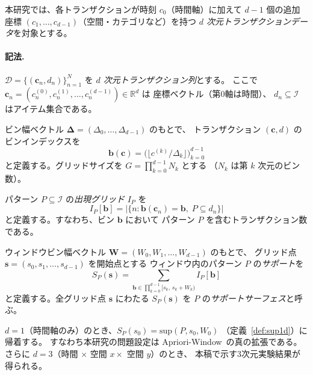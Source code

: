 本研究では、各トランザクションが時刻 $c_0$（時間軸）に加えて
$d-1$ 個の追加座標 $(c_1, \ldots, c_{d-1})$（空間・カテゴリなど）を持つ
\emph{$d$ 次元トランザクションデータ}を対象とする。

\paragraph{記法.}
$\mathcal{D} = \{(\bm{c}_n, d_n)\}_{n=1}^N$ を
\emph{$d$ 次元トランザクション列}とする。
ここで $\bm{c}_n = (c_n^{(0)}, c_n^{(1)}, \ldots, c_n^{(d-1)}) \in \mathbb{R}^d$ は
座標ベクトル（第0軸は時間）、
$d_n \subseteq \mathcal{I}$ はアイテム集合である。

\begin{definition}[$d$ 次元ビンインデックス]\label{def:bin_nd}
ビン幅ベクトル $\bm{\Delta} = (\Delta_0, \ldots, \Delta_{d-1})$ のもとで、
トランザクション $(\bm{c}, d)$ のビンインデックスを
\[
  \bm{b}(\bm{c}) = \bigl(\lfloor c^{(k)} / \Delta_k \rfloor\bigr)_{k=0}^{d-1}
\]
と定義する。グリッドサイズを $G = \prod_{k=0}^{d-1} N_k$ とする
（$N_k$ は第 $k$ 次元のビン数）。
\end{definition}

\begin{definition}[$d$ 次元アイテム出現グリッド]\label{def:item_grid_nd}
パターン $P \subseteq \mathcal{I}$ の\emph{出現グリッド} $I_P$ を
\[
  I_P[\bm{b}]
  = \bigl|\{n : \bm{b}(\bm{c}_n) = \bm{b},\; P \subseteq d_n\}\bigr|
\]
と定義する。すなわち、ビン $\bm{b}$ において
パターン $P$ を含むトランザクション数である。
\end{definition}

\begin{definition}[$d$ 次元スライディングウィンドウサポート]\label{def:support_nd}
ウィンドウビン幅ベクトル $\bm{W} = (W_0, W_1, \ldots, W_{d-1})$ のもとで、
グリッド点 $\bm{s} = (s_0, s_1, \ldots, s_{d-1})$ を開始点とする
ウィンドウ内のパターン $P$ の\emph{サポート}を
\begin{equation}\label{eq:support_nd}
  S_P(\bm{s})
  = \sum_{\bm{b} \in \prod_{k=0}^{d-1} [s_k,\, s_k + W_k)}
    I_P[\bm{b}]
\end{equation}
と定義する。全グリッド点 $\bm{s}$ にわたる $S_P(\bm{s})$ を
$P$ の\emph{サポートサーフェス}と呼ぶ。
\end{definition}

\begin{remark}[1次元設定への帰着]\label{rem:1d_reduction}
$d = 1$（時間軸のみ）のとき、$S_P(s_0) = \mathrm{sup}(P, s_0, W_0)$
（定義~\ref{def:sup1d}）に帰着する。
すなわち本研究の問題設定は Apriori-Window~\cite{aprioriwindow}の真の拡張である。
さらに $d = 3$（時間 $\times$ 空間 $x \times$ 空間 $y$）のとき、
本稿で示す3次元実験結果が得られる。
\end{remark}

